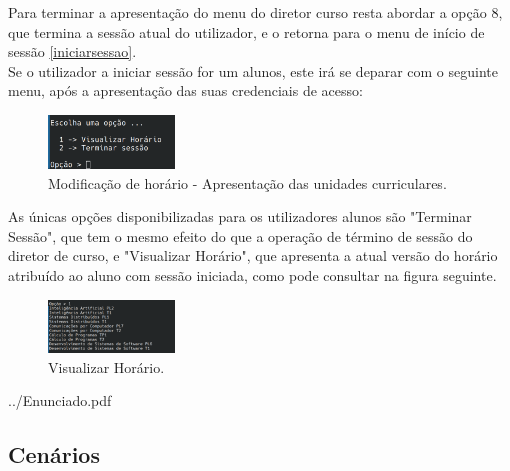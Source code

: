 \documentclass[12pt, a4paper]{article}
\makeatletter
\renewcommand\section[1]{
    \newpage
    \thispagestyle{empty}
    \vspace*{\fill}
    \@startsection{section}{1}{\z@}{0px}{50px}{\normalfont\Huge\bfseries}{#1}
    \vspace*{\fill}
    \newpage
}
\makeatother
\begin{document}
Para terminar a apresentação do menu do diretor curso resta abordar a opção 8, que termina a sessão
atual do utilizador, e o retorna para o menu de início de sessão \ref{iniciarsessao}. \\

Se o utilizador a iniciar sessão for um alunos, este irá se deparar com o seguinte menu, após a
apresentação das suas credenciais de acesso: \\

\begin{figure}[H]
    \centering
    \includegraphics[width=0.3\textwidth]{Imagens/Manual/Aluno.png}
    \caption{Modificação de horário - Apresentação das unidades curriculares.}
\end{figure}

As únicas opções disponibilizadas para os utilizadores alunos são "Terminar Sessão", que tem o
mesmo efeito do que a operação de término de sessão do diretor de curso, e "Visualizar Horário",
que apresenta a atual versão do horário atribuído ao aluno com sessão iniciada, como pode consultar
na figura seguinte. \\

\begin{figure}[H]
    \centering
    \includegraphics[width=0.3\textwidth]{Imagens/Manual/Aluno-1.png}
    \caption{Visualizar Horário.}
\end{figure}

\section{Anexos}


    {../Enunciado.pdf}


\subsection{Cenários}
\label{use-cases}
\end{document}
